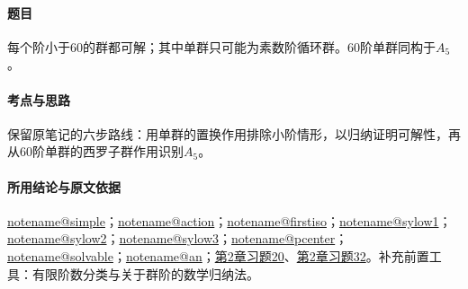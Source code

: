 \documentclass[UTF8,a4paper,11pt,fontset=windows]{ctexart}
\makeatletter
\newcommand{\noteref}[1]{\hyperref[note:#1]{\csname notename@#1\endcsname}}
\newcommand{\exref}[2]{\hyperref[ex:#1:#2]{第#1章习题#2}}
\makeatother
\begin{document}
\paragraph{题目}
每个阶小于60的群都可解；其中单群只可能为素数阶循环群。60阶单群同构于$A_5$。

\paragraph{考点与思路}
保留原笔记的六步路线：用单群的置换作用排除小阶情形，以归纳证明可解性，再从60阶单群的西罗子群作用识别$A_5$。

\paragraph{所用结论与原文依据}
\noteref{simple}；\noteref{action}；\noteref{firstiso}；\noteref{sylow1}；\noteref{sylow2}；\noteref{sylow3}；\noteref{pcenter}；\noteref{solvable}；\noteref{an}；\exref{2}{20}、\exref{2}{32}。补充前置工具：有限阶数分类与关于群阶的数学归纳法。

\end{document}
